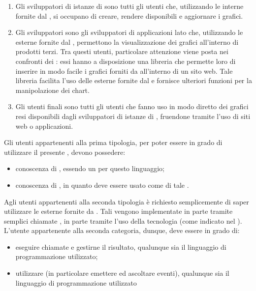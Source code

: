 		\begin{enumerate}
			\item Gli sviluppatori di istanze di  sono tutti gli utenti che, utilizzando le  interne fornite dal , si occupano di creare, rendere disponibili e aggiornare i grafici.
			\item Gli sviluppatori  sono gli sviluppatori di applicazioni lato  che, utilizzando le  esterne fornite dal , permettono la visualizzazione dei grafici all'interno di prodotti terzi. Tra questi utenti, particolare attenzione viene posta nei confronti dei : essi hanno a disposizione una libreria che permette loro di inserire in modo facile i grafici forniti da  all'interno di un sito web. Tale libreria facilita l'uso delle  esterne fornite dal  e fornisce ulteriori funzioni per la manipolazione dei chart.
			\item Gli utenti finali sono tutti gli utenti che fanno uso in modo diretto dei grafici resi disponibili dagli sviluppatori di istanze di , fruendone tramite l'uso di siti web o applicazioni.
		\end{enumerate}
		Gli utenti appartenenti alla prima tipologia, per poter essere in grado di utilizzare il presente , devono possedere:
		\begin{itemize}
			\item conoscenza di , essendo  un  per questo linguaggio;
			\item conoscenza di , in quanto  deve essere usato come  di tale .
		\end{itemize}
		Agli utenti appartenenti alla seconda tipologia è richiesto semplicemente di saper utilizzare le  esterne fornite da . Tali  vengono implementate in parte tramite semplici chiamate , in parte tramite l'uso della tecnologia  (come indicato nel ). L'utente appartenente alla seconda categoria, dunque, deve essere in grado di:
		\begin{itemize}
			\item eseguire chiamate  e gestirne il risultato, qualunque sia il linguaggio di programmazione utilizzato;
			\item utilizzare  (in particolare emettere ed ascoltare eventi), qualunque sia il linguaggio di programmazione utilizzato
		\end{itemize}
